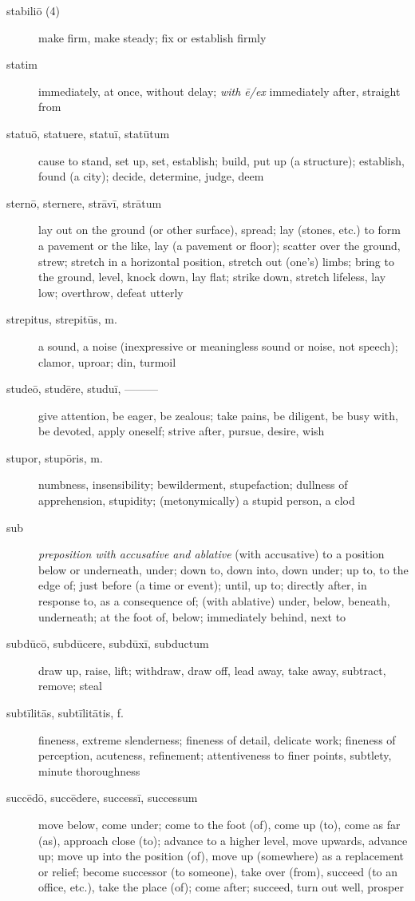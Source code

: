 \begin{description}
    \item[stabiliō (4)] make firm, make steady; fix or establish firmly
    \item[statim] \marginnote{*}immediately, at once, without delay; \textit{with ē/ex} immediately after, straight from
    \item[statuō, statuere, statuī, statūtum] \marginnote{*}cause to stand, set up, set, establish; build, put up (a structure); establish, found (a city); decide, determine, judge, deem
    \item[sternō, sternere, strāvī, strātum] lay out on the ground (or other surface), spread; lay (stones, etc.) to form a pavement or the like, lay (a pavement or floor); scatter over the ground, strew; stretch in a horizontal position, stretch out (one's) limbs; bring to the ground, level, knock down, lay flat; strike down, stretch lifeless, lay low; overthrow, defeat utterly
    \item[strepitus, strepitūs, m.] a sound, a noise (inexpressive or meaningless sound or noise, not speech); clamor, uproar; din, turmoil
    \item[studeō, studēre, studuī, ———] \marginnote{*}give attention, be eager, be zealous; take pains, be  diligent, be busy with, be devoted, apply oneself; strive after, pursue, desire, wish
    \item[stupor, stupōris, m.] numbness, insensibility; bewilderment, stupefaction; dullness of apprehension, stupidity; (metonymically) a stupid person, a clod
    \item[sub] \marginnote{*}\textit{preposition with accusative and ablative} (with accusative) to a position below or underneath, under; down to, down into, down under; up to, to the edge of; just before (a time or event); until, up to; directly after, in response to, as a consequence of; (with ablative) under, below, beneath, underneath; at the foot of, below; immediately behind, next to
    \item[subdūcō, subdūcere, subdūxī, subductum] draw up, raise, lift; withdraw, draw off, lead away, take away, subtract, remove; steal
    \item[subtīlitās, subtīlitātis, f.] fineness, extreme slenderness; fineness of detail, delicate work; fineness of perception, acuteness, refinement; attentiveness to finer points, subtlety, minute thoroughness
    \item[succēdō, succēdere, successī, successum] move below, come under; come to the foot (of), come up (to), come as far (as), approach close (to); advance to a higher level, move upwards, advance up; move up into the position (of), move up (somewhere) as a replacement or relief; become successor (to someone), take over (from), succeed (to an office, etc.), take the place (of); come after; succeed, turn out well, prosper

\end{description}
